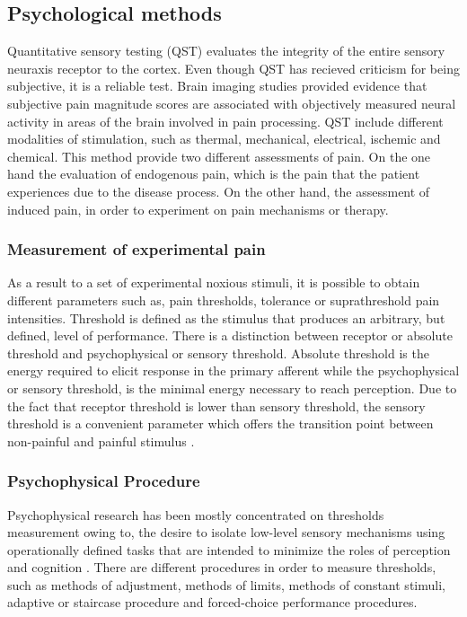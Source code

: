 \subsection{Psychological methods}
Quantitative sensory testing (QST) evaluates the integrity of the entire sensory neuraxis receptor to the cortex. Even though QST has recieved criticism for being subjective, it is a reliable test. Brain imaging studies provided evidence that subjective pain magnitude scores are associated with objectively measured neural activity in areas of the brain involved in pain processing. QST include different modalities of stimulation, such as thermal, mechanical, electrical, ischemic and chemical. This method provide two different assessments of pain. On the one hand the  evaluation of endogenous pain, which is the pain that the patient experiences due to the disease process. On the other hand, the assessment of induced pain, in order to experiment on pain mechanisms or therapy. \cite{neurop_exam}


\subsubsection{Measurement of experimental pain}
As a result to a set of experimental noxious stimuli, it is possible to obtain different parameters such as, pain thresholds, tolerance or suprathreshold pain intensities. Threshold is defined as the stimulus that produces an arbitrary, but defined, level of performance. There is a distinction between receptor or absolute threshold and psychophysical or sensory threshold. Absolute threshold is the energy required to elicit response in the primary afferent while the psychophysical or sensory threshold, is the minimal energy necessary to reach perception. Due to the fact that receptor threshold is lower than sensory threshold, the sensory threshold is a convenient parameter which offers the transition point between non-painful and painful stimulus \cite{neurop_exam}.

\subsubsection{Psychophysical Procedure}
Psychophysical research has been mostly concentrated on thresholds measurement owing to, the desire to isolate low-level sensory mechanisms using operationally defined tasks that are intended to minimize the roles of perception and cognition \cite{psy_methods}. There are different procedures in order to measure thresholds, such as methods of adjustment, methods of limits, methods of constant stimuli, adaptive or staircase procedure and forced-choice performance procedures. 

